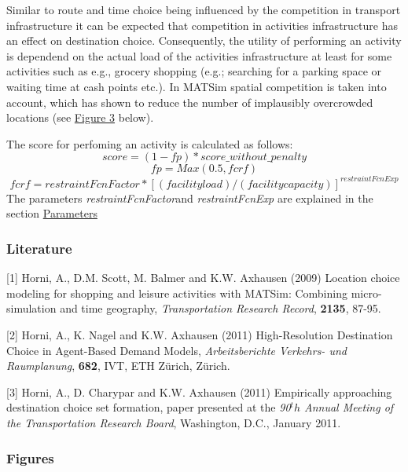 Similar to route and time choice being influenced by  the competition in transport infrastructure it can be expected that  competition in activities infrastructure has an effect on destination  choice. Consequently, the utility of performing an activity is dependend  on the actual load of the activities infrastructure at least for some  activities such as e.g., grocery shopping (e.g.; searching for a parking  space or waiting time at cash points etc.). In MATSim spatial  competition is taken into account, which has shown to reduce the number  of implausibly overcrowded locations (see \hyperlink{Figure3}{Figure 3} below).

The score for perfoming an activity is calculated as follows:
\[
score = (1- fp) * score\_without\_penalty
\]
\[
fp = Max(0.5, fcrf)
\]
\[
fcrf = restraintFcnFactor * [(facility load) / (facility capacity)]^{restraintFcnExp}
\]
The parameters \emph{restraintFcnFactor}and \emph{restraintFcnExp }are explained in the section \hyperlink{parameters}{Parameters}


\subsubsection{{Literature}}

[1] Horni, A., D.M. Scott, M. Balmer and K.W. Axhausen (2009)  Location choice modeling for shopping and leisure activities with  MATSim: Combining micro-simulation and time geography, \emph{Transportation Research Record}, \textbf{2135}, 87-95.

[2] Horni, A., K. Nagel and K.W. Axhausen (2011) High-Resolution Destination Choice in Agent-Based Demand Models, \emph{Arbeitsberichte Verkehrs- und Raumplanung}, \textbf{682}, IVT, ETH Zürich, Zürich.

[3] Horni, A., D. Charypar and K.W. Axhausen (2011) Empirically  approaching destination choice set formation, paper presented at the \emph{90$^th$ Annual Meeting of the Transportation Research Board}, Washington, D.C., January 2011.

\subsubsection{Figures}


